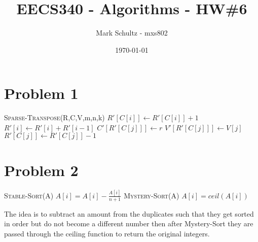 \documentclass[11pt]{article}
\begin{document}
\title{EECS340 - Algorithms - HW\#6}
\date{\today}
\author{Mark Schultz - mxs802}
\maketitle
\vspace{2in}
\section*{Problem 1}
\begin{algorithmic}[1]
\STATE \textsc{Sparse-Transpose}(R,C,V,m,n,k)
\STATE $R\prime [C[i]] \leftarrow R\prime [C[i]]+1$
\ENDFOR
{}
\STATE $R\prime [i] \leftarrow R\prime [i] + R\prime [i-1]$
\ENDFOR
{}
\STATE $C\prime [R\prime [C[j]]] \leftarrow r$
\STATE $V\prime [R\prime [C[j]]] \leftarrow V[j]$
\STATE $R\prime [C[j]] \leftarrow R\prime [C[j]]-1$
\ENDFOR
\ENDFOR
\end{algorithmic}
\section*{Problem 2}
\begin{algorithmic}[1]
\STATE \textsc{Stable-Sort(A)}
\STATE $A[i]=A[i]-\frac{A[i]}{n+1}$
\ENDFOR
\STATE \textsc{Mystery-Sort(A)}
\STATE $A[i]=ceil(A[i])$
\ENDFOR
\end{algorithmic}

The idea is to subtract an amount from the duplicates such that they get sorted in order but do not become a different number then after Mystery-Sort they are passed through the ceiling function to return the original integers.
\end{document}
